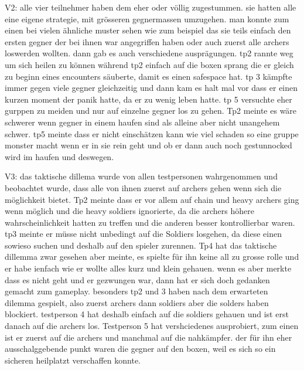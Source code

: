 \documentclass[../Main.tex]{subfiles}
\begin{document}
V2: alle vier teilnehmer haben dem eher oder völlig zugestummen. sie hatten alle eine eigene strategie, mit grösseren gegnermassen umzugehen. man konnte zum einen bei vielen ähnliche muster sehen wie zum beispiel das sie teils einfach den ersten gegner der bei ihnen war angegriffen haben oder auch zuerst alle archers loswerden wollten. dann gab es auch verschiedene ausprägungen. tp2 rannte weg um sich heilen zu können während tp2 einfach auf die boxen sprang die er gleich zu beginn eines encounters säuberte, damit es einen safespace hat. tp 3 kämpfte immer gegen viele gegner gleichzeitig und dann kam es halt mal vor dass er einen kurzen moment der panik hatte, da er zu wenig leben hatte. tp 5 versuchte eher gurppen zu meiden und nur auf einzelne gegner los zu gehen.
Tp2 meinte es wäre schwerer wenn gegner in einem haufen sind als alleine aber nicht unangehem schwer. tp5 meinte dass er nicht einschätzen kann wie viel schaden so eine gruppe monster macht wenn er in sie rein geht und ob er dann auch noch gestunnocked wird im haufen und deswegen.

V3: das taktische dillema wurde von allen testpersonen wahrgenommen und beobachtet wurde, dass alle von ihnen zuerst auf archers gehen wenn sich die möglichkeit bietet. Tp2 meinte dass er vor allem auf chain und heavy archers ging wenn möglich und die heavy soldiers ignorierte, da die archers höhere wahrscheinlichkeit hatten zu treffen und die anderen besser kontrollierbar waren. tp3 meinte er müsse nicht unbedingt auf die Soldiers losgehen, da diese einen sowieso suchen und deshalb auf den spieler zurennen. Tp4 hat das taktische dillemma zwar gesehen aber meinte, es spielte für ihn keine all zu grosse rolle und er habe ienfach wie er wollte alles kurz und klein gehauen. wenn es aber merkte dass es nicht geht und er gezwungen war, dann hat er sich doch gedanken gemacht zum gameplay.
besonders tp2 und 3 haben nach dem erwarteten dilemma gespielt, also zuerst archers dann soldiers aber die solders haben blockiert. testperson 4 hat deshalb einfach auf die soldiers gehauen und ist erst danach auf die archers los. Testperson 5 hat vershciedenes ausprobiert, zum einen ist er zuerst auf die archers und manchmal auf die nahkämpfer. der für ihn eher ausschalggebende punkt waren die gegner auf den boxen, weil es sich so ein sicheren heilplatzt verschaffen konnte.
\end{document}
